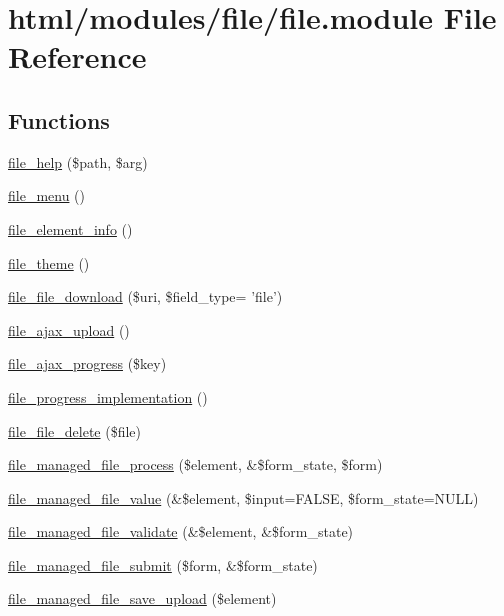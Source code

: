 \hypertarget{file_8module}{
\section{html/modules/file/file.module File Reference}
\label{file_8module}
}
\subsection*{Functions}
\begin{DoxyCompactItemize}
\item 
\hyperlink{file_8module_a24c3b4fe327392636d2d409f07cf8266}{file\_\-help} (\$path, \$arg)
\item 
\hyperlink{file_8module_acf2d37bd1c1db6d3b8632a615bd40226}{file\_\-menu} ()
\item 
\hyperlink{file_8module_aa2a3477520eac39499554db31af9b905}{file\_\-element\_\-info} ()
\item 
\hyperlink{file_8module_a073bfda14a6169090471f7b93980d518}{file\_\-theme} ()
\item 
\hyperlink{file_8module_a3b90dc2df5781f1fe16027a3b8082948}{file\_\-file\_\-download} (\$uri, \$field\_\-type= 'file')
\item 
\hyperlink{file_8module_a01240c6ad20b49a60879a93211a4fdbb}{file\_\-ajax\_\-upload} ()
\item 
\hyperlink{file_8module_a97ec958e5f2329df3e66fbf0ca41abab}{file\_\-ajax\_\-progress} (\$key)
\item 
\hyperlink{file_8module_af97cd48da26f5ab56503fa1218a11a04}{file\_\-progress\_\-implementation} ()
\item 
\hyperlink{file_8module_a1fabb61995abd7c4361037cccf3f6d63}{file\_\-file\_\-delete} (\$file)
\item 
\hyperlink{file_8module_a1e1b9d0cfae09221706106e984a1b18c}{file\_\-managed\_\-file\_\-process} (\$element, \&\$form\_\-state, \$form)
\item 
\hyperlink{file_8module_a9cb9afc76f5078ef555e93a0513ae90f}{file\_\-managed\_\-file\_\-value} (\&\$element, \$input=FALSE, \$form\_\-state=NULL)
\item 
\hyperlink{file_8module_adf68e5c79852aee513af71c70f5bc511}{file\_\-managed\_\-file\_\-validate} (\&\$element, \&\$form\_\-state)
\item 
\hyperlink{file_8module_a4343cdafac927e9f8ba7156776829c71}{file\_\-managed\_\-file\_\-submit} (\$form, \&\$form\_\-state)
\item 
\hyperlink{file_8module_a0179609c4b4e28da21121e04ce05cdd3}{file\_\-managed\_\-file\_\-save\_\-upload} (\$element)

\end{DoxyCompactItemize}
